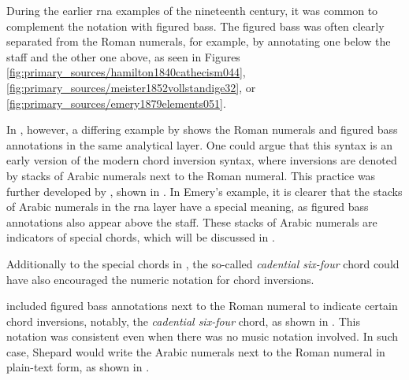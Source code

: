 
During the earlier \gls{rna} examples of the nineteenth
century, it was common to complement the notation with
figured bass. The figured bass was often clearly separated
from the Roman numerals, for example, by annotating one
below the staff and the other one above, as seen in Figures
\ref{fig:primary_sources/hamilton1840cathecism044},
\ref{fig:primary_sources/meister1852vollstandige32}, or
\ref{fig:primary_sources/emery1879elements051}.

In ,
however, a differing example by
\textcite{bussler1878praktische} shows the Roman numerals
and figured bass annotations in the same analytical layer.
One could argue that this syntax is an early version of the
modern chord inversion syntax, where inversions are denoted
by stacks of Arabic numerals next to the Roman numeral. This
practice was further developed by
\textcite{emery1879elements}, shown in
. In Emery's
example, it is clearer that the stacks of Arabic numerals in
the \gls{rna} layer have a special meaning, as figured bass
annotations also appear above the staff. These stacks of
Arabic numerals are indicators of special chords, which will
be discussed in
.


Additionally to the special chords in
\textcite{emery1879elements}, the so-called \emph{cadential
six-four} chord could have also encouraged the numeric
notation for chord inversions.

\textcite{shepard1896harmony} included figured bass
annotations next to the Roman numeral to indicate certain
chord inversions, notably, the \emph{cadential six-four}
chord, as shown in
. This
notation was consistent even when there was no music
notation involved. In such case, Shepard would write the
Arabic numerals next to the Roman numeral in plain-text
form, as shown in
.

